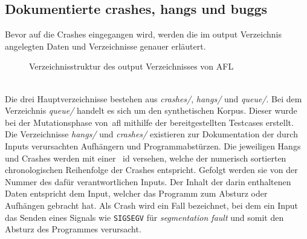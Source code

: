 
\subsection{Dokumentierte crashes, hangs und buggs}\label{subsec:dokumentierte-crashes-hangs-und-buggs}
Bevor auf die Crashes eingegangen wird, werden die im output Verzeichnis angelegten Daten und Verzeichnisse genauer erläutert.
\begin{figure}[h]
    \caption{Verzeichnisstruktur des output Verzeichnisses von AFL}\label{fig:out-dir-structure}
\end{figure}\\
Die drei Hauptverzeichnisse bestehen aus \textit{crashes/}, \textit{hangs/} und \textit{queue/}.
Bei dem Verzeichnis \textit{queue/} handelt es sich um den synthetischen Korpus.
Dieser wurde bei der Mutationsphase von~\gls{afl} mithilfe der bereitgestellten Testcases erstellt. \\
Die Verzeichnisse \textit{hangs/} und \textit{crashes/} existieren zur Dokumentation der durch Inputs verursachten Aufhängern
und Programmabstürzen.
Die jeweiligen Hangs und Crashes werden mit einer ~\gls{id} versehen, welche der numerisch sortierten chronologischen Reihenfolge
der Crashes entspricht.
Gefolgt werden sie von der Nummer des dafür verantwortlichen Inputs.
Der Inhalt der darin enthaltenen Daten entspricht dem Input, welcher das Programm zum Absturz oder Aufhängen gebracht hat.
Als Crash wird ein Fall bezeichnet, bei dem ein Input das Senden eines Signals wie \texttt{SIGSEGV} für \textit{segmentation fault}
und somit den Absturz des Programmes verursacht.
